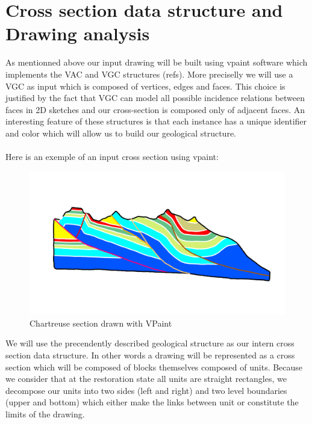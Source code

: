 \documentclass[12pt, a4paper]{memoir} %
\begin{document}
\section{Cross section data structure and Drawing analysis}

As mentionned above our input drawing will be built using vpaint software which implements the VAC and VGC structures (refs).
More preciselly we will use a VGC as input which is composed of vertices, edges and faces. This choice is justified by the fact that VGC can model all possible incidence relations between faces in 2D sketches and our cross-section is composed only of adjacent faces. An interesting feature of these structures is that each instance has a unique identifier and color which will allow us to build our geological structure.\\\\
Here is an exemple of an input cross section using vpaint:

 \begin{figure}[H]
	\centering
	\includegraphics[scale=0.5]{chartreusevpaint.png}
	\caption{Chartreuse section drawn with VPaint}
\end{figure}

We will use the precendently described geological structure as our intern cross section data structure. In other words a drawing will be represented as a cross section which will be composed of blocks themselves composed of units. Because we consider that at the restoration state all units are straight rectangles, we decompose our units into two sides (left and right) and two level boundaries (upper and bottom) which either make the links between unit or constitute the limits of the drawing. 
\end{document}
